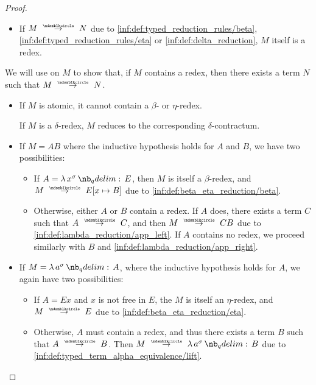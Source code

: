 \begin{proof}
\begin{itemize}
    \item If \( M \pred N \) due to \ref{inf:def:typed_reduction_rules/beta}, \ref{inf:def:typed_reduction_rules/eta} or \ref{inf:def:delta_reduction}, \( M \) itself is a redex.
  \end{itemize}

  \NecessitySubProof* We will use  on \( M \) to show that, if \( M \) contains a redex, then there exists a term \( N \) such that \( M \pred N \).

  \begin{itemize}
    \item If \( M \) is atomic, it cannot contain a \( \beta \)- or \( \eta \)-redex.

    If \( M \) is a \( \delta \)-redex, \( M \) reduces to the corresponding \( \delta \)-contractum.

    \item If \( M = AB \) where the inductive hypothesis holds for \( A \) and \( B \), we have two possibilities:
    \begin{itemize}
      \item If \( A = \qabs {x^\sigma} E \), then \( M \) is itself a \( \beta \)-redex, and \( M \pred E[x \mapsto B] \) due to \ref{inf:def:beta_eta_reduction/beta}.
      \item Otherwise, either \( A \) or \( B \) contain a redex. If \( A \) does, there exists a term \( C \) such that \( A \pred C \), and then \( M \pred CB \) due to \ref{inf:def:lambda_reduction/app_left}. If \( A \) contains no redex, we proceed similarly with \( B \) and \ref{inf:def:lambda_reduction/app_right}.
    \end{itemize}

    \item If \( M = \qabs {a^\sigma} A \), where the inductive hypothesis holds for \( A \), we again have two possibilities:
    \begin{itemize}
      \item If \( A = Ex \) and \( x \) is not free in \( E \), the \( M \) is itself an \( \eta \)-redex, and \( M \pred E \) due to \ref{inf:def:beta_eta_reduction/eta}.

      \item Otherwise, \( A \) must contain a redex, and thus there exists a term \( B \) such that \( A \pred B \). Then \( M \pred \qabs {a^\sigma} B \) due to \ref{inf:def:typed_term_alpha_equivalence/lift}.
    \end{itemize}
  \end{itemize}
\end{proof}

